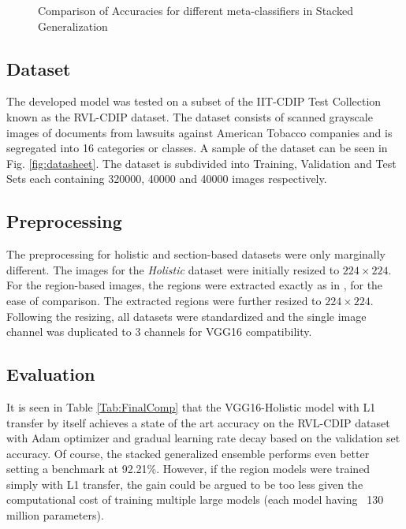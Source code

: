 \documentclass[10pt,conference,a4paper]{IEEEtran}
\begin{document}
\begin{figure}[t]
	\centering
	\caption{Comparison of Accuracies for different meta-classifiers in Stacked Generalization} \label{fig:stacking}
\end{figure}




\subsection{Dataset}
The developed model was tested on a subset of the IIT-CDIP Test Collection known as the RVL-CDIP dataset. The dataset consists of scanned grayscale images of documents from lawsuits against American Tobacco companies and is segregated into 16 categories or classes. A sample of the dataset can be seen in Fig. \ref{fig:datasheet}. The dataset is subdivided into Training, Validation and Test Sets each containing 320000, 40000 and 40000 images respectively.


\subsection{Preprocessing}
The preprocessing for holistic and section-based datasets were only marginally different. The images for the \textit{Holistic} dataset were initially resized to $224 \times 224$. For the region-based images, the regions were extracted exactly as in \cite{harley2015evaluation}, for the ease of comparison. The extracted regions were further resized to $224 \times 224$. Following the resizing, all datasets were standardized and the single image channel was duplicated to 3 channels for VGG16 compatibility.


\subsection{Evaluation}
It is seen in Table \ref{Tab:FinalComp} that the VGG16-Holistic model with L1 transfer by itself achieves a state of the art accuracy on the RVL-CDIP dataset with Adam optimizer and gradual learning rate decay based on the validation set accuracy. Of course, the stacked generalized ensemble performs even better setting a benchmark at 92.21\%. However, if the region models were trained simply with L1 transfer, the gain could be argued to be too less given the computational cost of training multiple large models (each model having ~130 million parameters).
\end{document}
